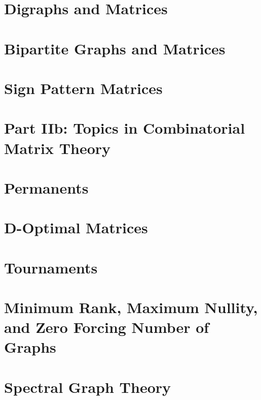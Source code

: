\documentclass[a4paper]{article}
\begin{document}
\section{Digraphs and Matrices}

\section{Bipartite Graphs and Matrices}

\section{Sign Pattern Matrices}

\section*{Part IIb: Topics in Combinatorial Matrix Theory}

\section{Permanents}

\section{D-Optimal Matrices}

\section{Tournaments}

\section{Minimum Rank, Maximum Nullity, and Zero Forcing Number of Graphs}

\section{Spectral Graph Theory}
\end{document}
